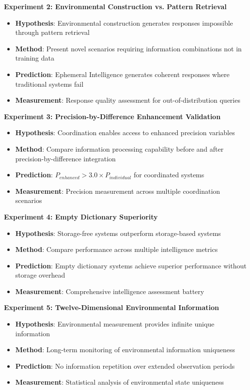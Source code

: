 \documentclass[12pt,a4paper]{article}
\begin{document}
\textbf{Experiment 2: Environmental Construction vs. Pattern Retrieval}
\begin{itemize}
\item \textbf{Hypothesis}: Environmental construction generates responses impossible through pattern retrieval
\item \textbf{Method}: Present novel scenarios requiring information combinations not in training data
\item \textbf{Prediction}: Ephemeral Intelligence generates coherent responses where traditional systems fail
\item \textbf{Measurement}: Response quality assessment for out-of-distribution queries
\end{itemize}

\textbf{Experiment 3: Precision-by-Difference Enhancement Validation}
\begin{itemize}
\item \textbf{Hypothesis}: Coordination enables access to enhanced precision variables
\item \textbf{Method}: Compare information processing capability before and after precision-by-difference integration
\item \textbf{Prediction}: $P_{enhanced} > 3.0 \times P_{individual}$ for coordinated systems
\item \textbf{Measurement}: Precision measurement across multiple coordination scenarios
\end{itemize}

\textbf{Experiment 4: Empty Dictionary Superiority}
\begin{itemize}
\item \textbf{Hypothesis}: Storage-free systems outperform storage-based systems
\item \textbf{Method}: Compare performance across multiple intelligence metrics
\item \textbf{Prediction}: Empty dictionary systems achieve superior performance without storage overhead
\item \textbf{Measurement}: Comprehensive intelligence assessment battery
\end{itemize}

\textbf{Experiment 5: Twelve-Dimensional Environmental Information}
\begin{itemize}
\item \textbf{Hypothesis}: Environmental measurement provides infinite unique information
\item \textbf{Method}: Long-term monitoring of environmental information uniqueness
\item \textbf{Prediction}: No information repetition over extended observation periods
\item \textbf{Measurement}: Statistical analysis of environmental state uniqueness
\end{itemize}
\end{document}

